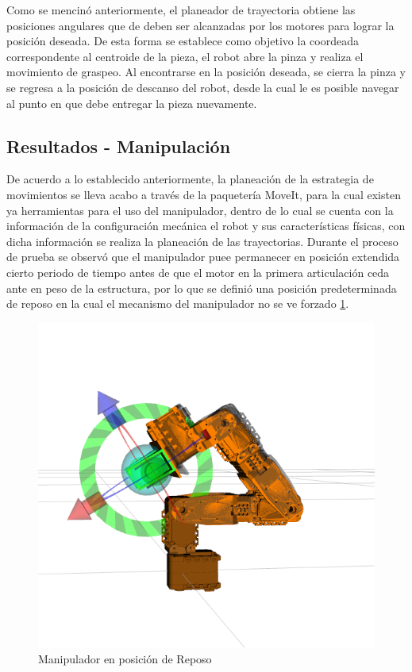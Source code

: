 Como se mencinó anteriormente, el planeador de trayectoria obtiene las posiciones angulares que de deben ser alcanzadas por los motores para lograr la posición deseada. De esta forma se establece como objetivo la coordeada correspondente al centroide de la pieza, el robot abre la pinza y realiza el movimiento de graspeo. Al encontrarse en la posición deseada, se cierra la pinza y se regresa a la posición de descanso del robot, desde la cual le es posible navegar al punto en que debe entregar la pieza nuevamente.

\subsection{Resultados - Manipulación}
De acuerdo a lo establecido anteriormente, la planeación de la estrategia de movimientos se lleva acabo a través de la paquetería MoveIt, para la cual existen ya herramientas para el uso del manipulador, dentro de lo cual se cuenta con la información de la configuración mecánica el robot y sus características físicas, con dicha información se realiza la planeación de las trayectorias. Durante el proceso de prueba se observó que el manipulador puee permanecer en posición extendida cierto periodo de tiempo antes de que el motor en la primera articulación ceda ante en peso de la estructura, por lo que se definió una posición predeterminada de reposo en la cual el mecanismo del manipulador no se ve forzado \ref{fig:Arm_ResPos}.

\begin{figure}[H]
    \centering
    \includegraphics[scale=0.25]{Figures/Arm_RestPos.png}
        \caption{Manipulador en posición de Reposo}
        \label{fig:Arm_ResPos}
\end{figure}

